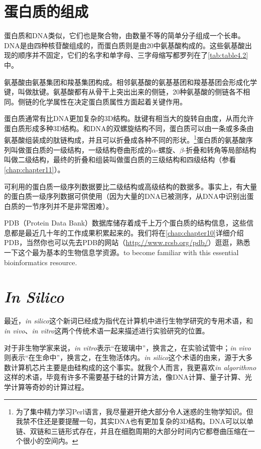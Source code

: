 \section{蛋白质的组成}
  蛋白质和DNA类似，它们也是聚合物，由数量不等的简单分子组成一个长串。DNA是由四种核苷酸组成的，而蛋白质则是由20中氨基酸构成的。这些氨基酸出现的顺序并不固定，它们的名字和单字母、三字母缩写都罗列在了\autoref{tab:table4.2}中。

氨基酸由氨基集团和羧基集团构成。相邻氨基酸的氨基基团和羧基基团会形成化学键，叫做肽键。氨基酸都有从骨干上突出出来的侧链，20种氨基酸的侧链各不相同。侧链的化学属性在决定蛋白质属性方面起着关键作用。

蛋白质通常有比DNA更加复杂的3D结构。肽键有相当大的旋转自由度，从而允许蛋白质形成多种3D结构。和DNA的双螺旋结构不同，蛋白质可以由一条或多条由氨基酸组装成的肽链构成，并且可以折叠成各种不同的形状。\footnote{为了集中精力学习Perl语言，我尽量避开绝大部分令人迷惑的生物学知识。但我禁不住还是要提醒一句，其实DNA也有更加复杂的3D结构。DNA可以以单链、双链和三链形式存在，并且在细胞周期的大部分时间内它都卷曲压缩在一个很小的空间内。}蛋白质的氨基酸序列叫做蛋白质的一级结构，一级结构卷曲形成的$\alpha$-螺旋、$\beta$-折叠和转角等局部结构叫做二级结构，最终的折叠和组装叫做蛋白质的三级结构和四级结构（参看\autoref{chap:chapter11}）。

可利用的蛋白质一级序列数据要比二级结构或高级结构的数据多。事实上，有大量的蛋白质一级序列数据可供使用（因为大量的DNA已被测序，从DNA中识别出蛋白质的一节序列并不是非常困难）。

PDB（Protein Data
Bank）数据库储存着成千上万个蛋白质的结构信息，这些信息都是最近几十年的工作成果积累起来的。我们将在\autoref{chap:chapter10}详细介绍PDB，当然你也可以先去PDB的网站（\href{http://www.rcsb.org/pdb/}{http://www.rcsb.org/pdb/}）逛逛，熟悉一下这个最为基本的生物信息学资源。to become familiar with this essential bioinformatics resource. 

\section{\textit{In Silico}}
  最近，\textit{in silico}这个新词已经成为指代在计算机中进行生物学研究的专用术语，和\textit{in vivo}、\textit{in vitro}这两个传统术语一起来描述进行实验研究的位置。

  对于非生物学家来说，\textit{in vitro}表示“在玻璃中”，换言之，在实验试管中；\textit{in vivo}则表示“在生命中”，换言之，在生物活体内。\textit{in silico}这个术语的由来，源于大多数计算机芯片主要是由硅构成的这个事实。就我个人而言，我更喜欢\textit{in algorithmo}这样的术语，毕竟有许多不需要基于硅的计算方法，像DNA计算、量子计算、光学计算等奇妙的计算过程。

